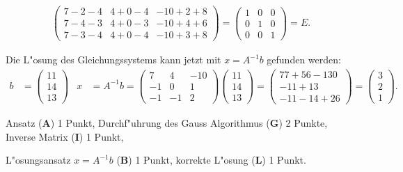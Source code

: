 \begin{loesung}
\begin{teilaufgaben}
\begin{align*}
\begin{pmatrix}
7-2-4&4+0-4&-10+2+8\\
7-4-3&4+0-3&-10+4+6\\
7-3-4&4+0-4&-10+3+8
\end{pmatrix}
=\begin{pmatrix}
1&0&0\\
0&1&0\\
0&0&1
\end{pmatrix}=E.
\end{align*}
\item Die L"osung des Gleichungssystems kann jetzt mit $x=A^{-1}b$ gefunden
werden:
\begin{align*}
b&=
\begin{pmatrix}11\\14\\13\end{pmatrix}
&
x&=A^{-1}b=
\begin{pmatrix}
 7& 4&-10\\
-1& 0&  1\\
-1&-1&  2
\end{pmatrix}
\begin{pmatrix}11\\14\\13\end{pmatrix}
=
\begin{pmatrix}
77+56-130\\
-11+13\\
-11-14+26
\end{pmatrix}
=
\begin{pmatrix}
3\\
2\\
1
\end{pmatrix}.
\end{align*}
\end{teilaufgaben}
\end{loesung}

\begin{bewertung}
\begin{teilaufgaben}
\item
Ansatz (\textbf{A}) 1 Punkt,
Durchf"uhrung des Gauss Algorithmus (\textbf{G}) 2 Punkte,
Inverse Matrix (\textbf{I}) 1 Punkt,
\item
L"osungsansatz $x=A^{-1}b$ (\textbf{B}) 1 Punkt,
korrekte L"osung (\textbf{L}) 1 Punkt.
\end{teilaufgaben}
\end{bewertung}

